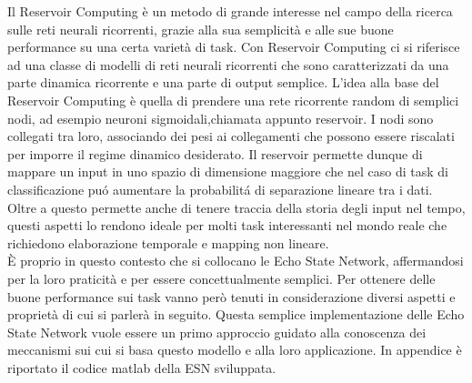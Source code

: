 
Il Reservoir Computing \`e un metodo di grande interesse nel campo della ricerca sulle reti neurali ricorrenti, grazie alla sua semplicit\`a e alle sue buone performance su una certa variet\`a di task. Con Reservoir Computing ci si riferisce  ad una classe di modelli di reti neurali ricorrenti che sono caratterizzati da una parte dinamica ricorrente e una parte di output semplice. L'idea alla base del Reservoir Computing \`e quella di prendere una rete ricorrente random di semplici nodi, ad esempio neuroni sigmoidali,chiamata appunto reservoir. I nodi sono collegati tra loro, associando dei pesi ai collegamenti che possono essere riscalati per imporre il regime dinamico desiderato. Il reservoir permette dunque di mappare un input in uno spazio di dimensione maggiore che nel caso di task di classificazione pu\'o aumentare la probabilit\'a di separazione lineare tra i dati. Oltre  a questo permette anche di tenere traccia della storia degli input nel tempo, questi aspetti lo rendono ideale per molti task interessanti nel mondo reale che richiedono elaborazione temporale e mapping non lineare.\\
 È proprio in questo contesto che si collocano le Echo State Network, affermandosi per la loro praticità e per essere concettualmente semplici. Per ottenere delle buone performance sui task vanno però tenuti in considerazione diversi aspetti e proprietà di cui si parlerà in seguito. Questa semplice implementazione delle Echo State Network vuole essere un primo approccio guidato alla conoscenza dei meccanismi sui cui si basa questo modello e alla loro applicazione.
In appendice è riportato il codice matlab della ESN sviluppata.


